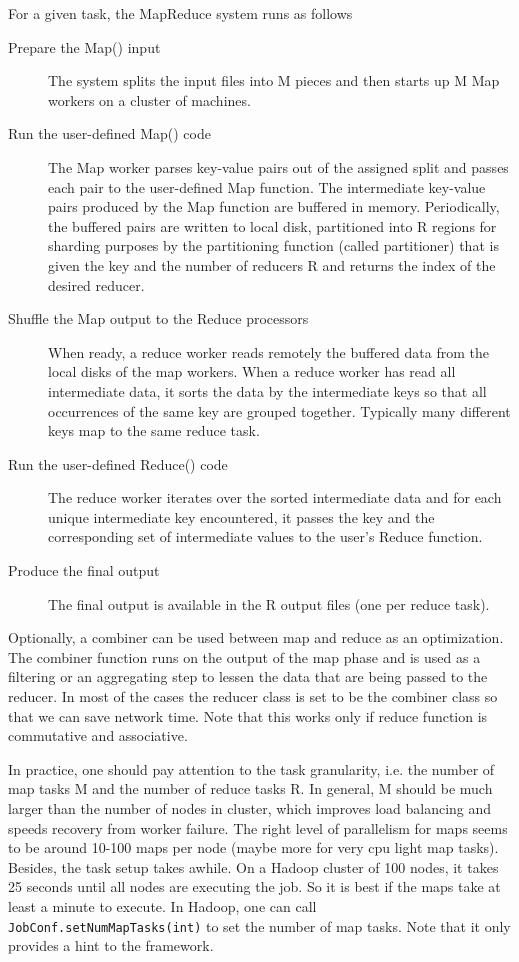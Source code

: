 \documentclass[11pt]{book}
\begin{document}
For a given task, the MapReduce system runs as follows
\begin{description}
\item[Prepare the Map() input]
The system splits the input files into M pieces and then starts up M Map workers on a cluster of machines.
\item[Run the user-defined Map() code]
The Map worker parses key-value pairs out of the assigned split and passes each pair to the user-defined Map function. The intermediate key-value pairs produced by the Map function are buffered in memory. Periodically, the buffered pairs are written to local disk, partitioned into R regions for sharding purposes by the partitioning function (called partitioner) that is given the key and the number of reducers R and returns the index of the desired reducer.
\item[Shuffle the Map output to the Reduce processors]
When ready, a reduce worker reads remotely the buffered data from the local disks of the map workers. When a reduce worker has read all intermediate data, it sorts the data by the intermediate keys so that all occurrences of the same key are grouped together. Typically many different keys map to the same reduce task.
\item[Run the user-defined Reduce() code]
The reduce worker iterates over the sorted intermediate data and for each unique intermediate key encountered, it passes the key and the corresponding set of intermediate values to the user's Reduce function.
\item[Produce the final output]
The final output is available in the R output files (one per reduce task).
\end{description}
Optionally, a combiner can be used between map and reduce as an optimization. The combiner function runs on the output of the map phase and is used as a filtering or an aggregating step to lessen the data that are being passed to the reducer. In most of the cases the reducer class is set to be the combiner class so that we can save network time. Note that this works only if reduce function is commutative and associative.

In practice, one should pay attention to the task granularity, i.e. the number of map tasks M and the number of reduce tasks R. In general, M should be much larger than the number of nodes in cluster, which improves load balancing and speeds recovery from worker failure. The right level of parallelism for maps seems to be around 10-100 maps per node (maybe more for very cpu light map tasks). Besides, the task setup takes awhile. On a Hadoop cluster of 100 nodes, it takes 25 seconds until all nodes are executing the job. So it is best if the maps take at least a minute to execute. In Hadoop, one can call \texttt{JobConf.setNumMapTasks(int)} to set the number of map tasks. Note that it only provides a hint to the framework.
\end{document}
